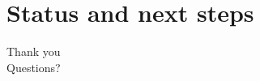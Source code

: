 \documentclass[aspectratio=169,10pt]{beamer}
\begin{document}
\section{Status and next steps}

\begin{frame}[standout]
Thank you\\[1ex]
\small Questions?
\end{frame}
\end{document}
